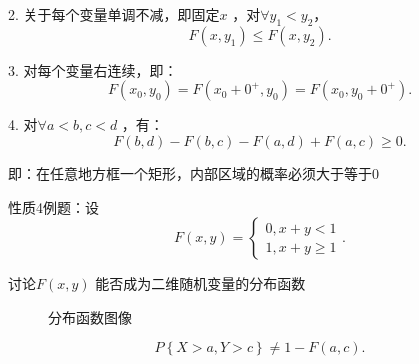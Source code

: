 2. 关于每个变量单调不减，即固定$x$ ，对$\forall y_1<y_2$， \[
    F\left( x,y_1 \right) \le F(x,y_2)
.\] 

3. 对每个变量右连续，即：\[
    F\left( x_0,y_0 \right) =F\left( x_0+0^{+},y_0 \right) =F\left( x_0,y_0+0^{+} \right) 
.\] 

4. 对$\forall a<b,c<d$ ，有：\[
    F\left( b,d \right) -F\left( b,c \right) -F\left( a,d \right) +F\left( a,c \right) \ge 0
.\] 

即：在任意地方框一个矩形，内部区域的概率必须大于等于0
\begin{eg}
    性质4例题：设 \[
        F\left( x,y \right) =\begin{cases}
            0,x+y<1\\
            1,x+y\ge 1
        \end{cases}
    .\] 

    讨论$F\left( x,y \right) $ 能否成为二维随机变量的分布函数

    \begin{figure}[htbp]
        \centering
        \caption{分布函数图像}
        \label{分布函数图像}
    \end{figure}
\end{eg}
\begin{notation}
    \[
        P\left\{ X>a,Y>c \right\} \neq 1-F\left( a,c \right) 
    .\] 
\end{notation}

